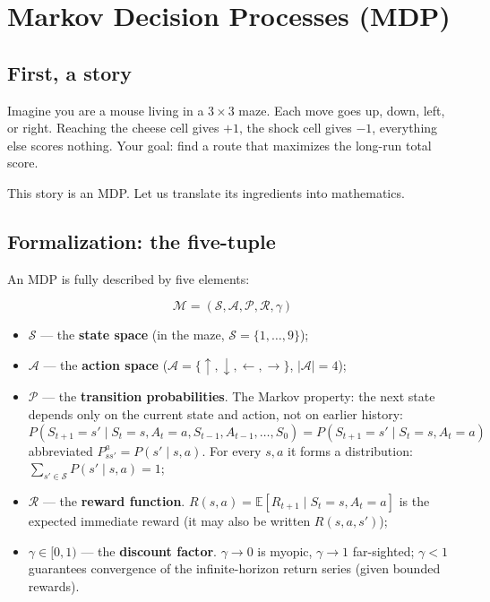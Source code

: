 \documentclass{article}
\begin{document}
\section*{Markov Decision Processes (MDP)}

\subsection*{First, a story}

Imagine you are a mouse living in a $3\times 3$ maze. Each move goes up, down, left, or right. Reaching the cheese cell gives $+1$, the shock cell gives $-1$, everything else scores nothing. Your goal: find a route that maximizes the long-run total score.

This story is an MDP. Let us translate its ingredients into mathematics.

\subsection*{Formalization: the five-tuple}

An MDP is fully described by five elements:

\[
\boxed{\mathcal{M} = (\mathcal{S}, \mathcal{A}, \mathcal{P}, \mathcal{R}, \gamma)}
\]

\begin{itemize}
  \item $\mathcal{S}$ --- the \textbf{state space} (in the maze, $\mathcal{S}=\{1,\ldots,9\}$);
  \item $\mathcal{A}$ --- the \textbf{action space} ($\mathcal{A}=\{\uparrow,\downarrow,\leftarrow,\rightarrow\}$, $|\mathcal{A}|=4$);
  \item $\mathcal{P}$ --- the \textbf{transition probabilities}. The Markov property: the next state depends only on the current state and action, not on earlier history:
        \[
        P(S_{t+1}=s' \mid S_t=s, A_t=a, S_{t-1}, A_{t-1},\ldots,S_0) = P(S_{t+1}=s' \mid S_t=s, A_t=a)
        \]
        abbreviated $P^{a}_{ss'} = P(s'\mid s,a)$. For every $s,a$ it forms a distribution: $\sum_{s'\in\mathcal{S}}P(s'\mid s,a)=1$;
  \item $\mathcal{R}$ --- the \textbf{reward function}. $R(s,a)=\mathbb{E}[R_{t+1}\mid S_t=s, A_t=a]$ is the expected immediate reward (it may also be written $R(s,a,s')$);
  \item $\gamma \in [0,1)$ --- the \textbf{discount factor}. $\gamma\to 0$ is myopic, $\gamma\to 1$ far-sighted; $\gamma<1$ guarantees convergence of the infinite-horizon return series (given bounded rewards).
\end{itemize}
\end{document}
